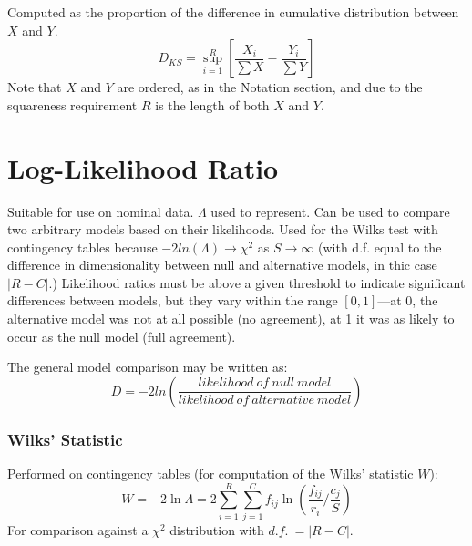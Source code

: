 \documentclass[11pt]{article}
\begin{document}
Computed as the proportion of the difference in cumulative distribution between $X$ and $Y$.
$$
D_{KS} = \sup_{i=1}^{R}\left[ \frac{ X_i }{ \sum{X} } - \frac{Y_i}{ \sum{Y} } \right]
$$
Note that $X$ and $Y$ are ordered, as in the Notation section, and due to the squareness requirement $R$ is the length of both $X$ and $Y$.
















\section{Log-Likelihood Ratio}
Suitable for use on nominal data.  $\Lambda$ used to represent.  Can be used to compare two arbitrary models based on their likelihoods.  Used for the Wilks test with contingency tables because $-2ln(\Lambda) \to \chi^2$ as $S \to \infty$ (with d.f. equal to the difference in dimensionality between null and alternative models, in thic case $|R-C|$.)  Likelihood ratios must be above a given threshold to indicate significant differences between models, but they vary within the range $[0, 1]$---at 0, the alternative model was not at all possible (no agreement), at 1 it was as likely to occur as the null model (full agreement).


The general model comparison may be written as:
$$
D = -2ln \left( \frac{ likelihood~of~null~model }{ likelihood~of~alternative~model } \right)
$$














\subsubsection{Wilks' Statistic}
Performed on contingency tables (for computation of the Wilks' statistic $W$):
$$
W = -2\ln\Lambda = 2 \sum_{i=1}^{R}{ \sum_{j=1}^{C}{ f_{ij}\ln \left( { \frac{f_{ij}}{r_i}  \bigg/  \frac{c_j}{S}  }  \right)   }}
$$
For comparison against a $\chi^2$ distribution with $d.f.~= |R-C|$.
\end{document}
